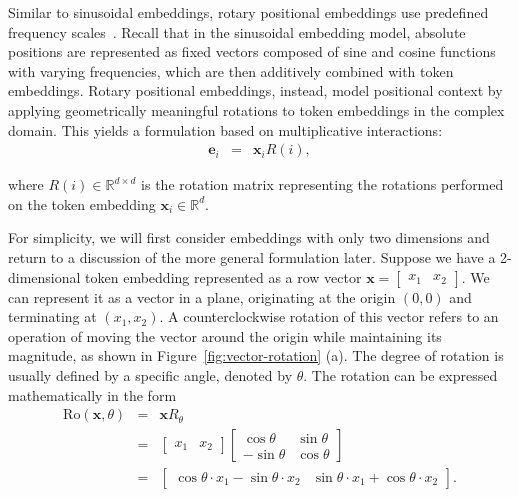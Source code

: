 \noindent Similar to sinusoidal embeddings, rotary positional embeddings use predefined frequency scales~\cite{su-etal:2024roformer}. Recall that in the sinusoidal embedding model, absolute positions are represented as fixed vectors composed of sine and cosine functions with varying frequencies, which are then additively combined with token embeddings. Rotary positional embeddings, instead, model positional context by applying geometrically meaningful rotations to token embeddings in the complex domain. This yields a formulation based on multiplicative interactions:
\begin{eqnarray}
\mathbf{e}_i & = & \mathbf{x}_i R(i) \label{eq:additive-embedding-e-base},
\end{eqnarray}

\noindent where $R(i) \in \mathbb{R}^{d \times d}$ is the rotation matrix representing the rotations performed on the token embedding $\mathbf{x}_i \in \mathbb{R}^{d}$.

For simplicity, we will first consider embeddings with only two dimensions and return to a discussion of the more general formulation later. Suppose we have a 2-dimensional token embedding represented as a row vector $\mathbf{x} = \begin{bmatrix} x_1 & x_2 \end{bmatrix}$. We can represent it as a vector in a plane, originating at the origin $(0,0)$ and terminating at $(x_1, x_2)$. A counterclockwise rotation of this vector refers to an operation of moving the vector around the origin while maintaining its magnitude, as shown in Figure~\ref{fig:vector-rotation} (a). The degree of rotation is usually defined by a specific angle, denoted by $\theta$. The rotation can be expressed mathematically in the form
\begin{eqnarray}
\mathrm{Ro}(\mathbf{x},\theta) & = & \mathbf{x} R_{\theta} \nonumber \\
                               & = & \begin{bmatrix} x_1 & x_2 \end{bmatrix}
                                     \begin{bmatrix} \cos \theta & \sin \theta \\ -\sin \theta & \cos \theta \end{bmatrix} \nonumber \\
                               & = & \begin{bmatrix} \cos \theta \cdot x_1 - \sin \theta \cdot x_2 & \sin \theta \cdot x_1 + \cos \theta \cdot x_2 \end{bmatrix}.
\end{eqnarray}

